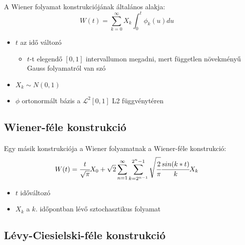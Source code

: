 \documentclass[11pt,a4paper]{article}
\begin{document}
				\paragraph{}
					A Wiener folyamat konstrukciójának általános alakja:
					$$W(t) = \sum_{k=0}^{\infty}X_k \int_0^t \phi_k (u) du$$
					\begin{itemize}
						\item $t$ az idő változó
						\begin{itemize}
							\item $t$-t elegendő $[0,1]$ intervallumon megadni, mert független növekményű Gauss folyamatról van szó
						\end{itemize}
						\item $X_k \sim N(0,1)$
						\item $\phi$ ortonormált bázis a $\mathcal{L}^2[0,1]$ L2 függvénytéren
					\end{itemize}
				\subsection{Wiener-féle konstrukció}
					\paragraph{}
						Egy másik konstrukciója a Wiener folyamatnak a Wiener-féle konstrukció:
						$$W(t) = \cfrac{t}{\sqrt{\pi}} X_0 + \sqrt{2} \sum_{n=1}^\infty \sum_{k = 2^{n-1}}^{2^n-1}\sqrt{\cfrac{2}{\pi}}\cfrac{sin(k*t)}{k} X_k$$
						\begin{itemize}
							\item $t$ időváltozó
							\item $X_k$ a $k.$ időpontban lévő sztochasztikus folyamat
						\end{itemize}
				\subsection{Lévy-Ciesielski-féle konstrukció}
\end{document}
